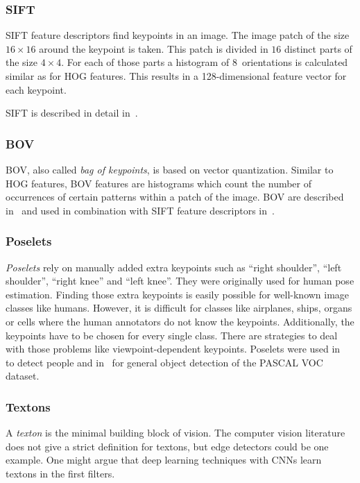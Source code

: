 \subsubsection{SIFT}
\Gls{SIFT} feature descriptors find keypoints in an image. The image patch of
the size $16 \times 16$ around the keypoint is taken. This patch is divided in
$16$ distinct parts of the size $4 \times 4$. For each of those parts a
histogram of 8~orientations is calculated similar as for \gls{HOG} features.
This results in a 128-dimensional feature vector for each keypoint.

\Gls{SIFT} is described in detail in~\cite{raey}.


\subsubsection{BOV}
\Gls{BOV}, also called \textit{bag of keypoints}, is based on vector
quantization. Similar to \gls{HOG} features, \gls{BOV} features are histograms
which count the number of occurrences of certain patterns within a patch of the
image. \Gls{BOV} are described in~\cite{csurka2004visual} and used in
combination with \gls{SIFT} feature descriptors in~\cite{csurka2008simple}.


\subsubsection{Poselets}
\textit{Poselets} rely on manually added extra keypoints such as \enquote{right
shoulder}, \enquote{left shoulder}, \enquote{right knee} and \enquote{left
knee}. They were originally used for human pose estimation. Finding those extra
keypoints is easily possible for well-known image classes like humans. However,
it is difficult for classes like airplanes, ships, organs or cells where the
human annotators do not know the keypoints. Additionally, the keypoints have to
be chosen for every single class. There are strategies to deal with those
problems like viewpoint-dependent keypoints. Poselets were used
in~\cite{bourdev2010detecting} to detect people and in~\cite{brox2011object}
for general object detection of the PASCAL VOC dataset.

\subsubsection{Textons}\label{subsubsec:textons}
A \textit{texton} is the minimal building block of vision. The computer vision
literature does not give a strict definition for textons, but edge detectors
could be one example. One might argue that deep learning techniques with
\glspl{CNN} learn textons in the first filters.

